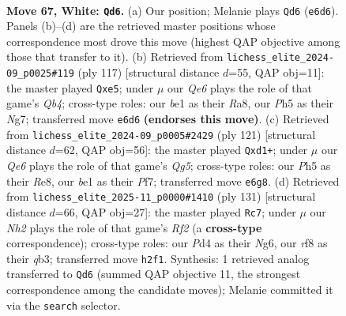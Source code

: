 \documentclass[11pt]{article}
\begin{document}
\begin{figure}[p]\centering
\begin{subfigure}{0.46\textwidth}\centering
\resizebox{\linewidth}{!}{%
\newchessgame
\chessboard[
  setfen={5rr1/p5p1/4Q2p/1k1p3P/p2P2P1/4P2K/q6N/4b3 w - - 42 67},
  showmover=false,
  pgfstyle=straightmove, color=movearrow, markmove={e6-d6}
]}
\caption{}
\end{subfigure}\hfill
\begin{subfigure}{0.46\textwidth}\centering
\resizebox{\linewidth}{!}{%
\newchessgame
\chessboard[
  setfen={r5k1/5pn1/2P1p1p1/1q2P1P1/4P3/p3Q3/2R3K1/2R5 b - - 0 59},
  showmover=false,
  pgfstyle=straightmove, color=movearrow, markmove={b5-e5}
]}
\caption{}
\end{subfigure}
\\[4pt]
\begin{subfigure}{0.46\textwidth}\centering
\resizebox{\linewidth}{!}{%
\newchessgame
\chessboard[
  setfen={4rk2/5p2/p6p/3R2p1/P1p3q1/2P3P1/1P3P2/3Q2K1 b - - 1 61},
  showmover=false,
  pgfstyle=straightmove, color=movearrow, markmove={g4-d1}
]}
\caption{}
\end{subfigure}\hfill
\begin{subfigure}{0.46\textwidth}\centering
\resizebox{\linewidth}{!}{%
\newchessgame
\chessboard[
  setfen={8/5r1k/1p4n1/1Pq5/5p2/1QB1pP1P/4R1PK/8 b - - 2 66},
  showmover=false,
  pgfstyle=straightmove, color=movearrow, markmove={f7-c7}
]}
\caption{}
\end{subfigure}
\caption{\textbf{Move 67, White: \texttt{Qd6}.} (a) Our position; Melanie plays \texttt{Qd6} (\texttt{e6d6}). Panels (b)--(d) are the retrieved master positions whose correspondence most drove this move (highest QAP objective among those that transfer to it). (b) Retrieved from \texttt{lichess\_elite\_2024-09\_p0025\#119} (ply 117) [structural distance $d$=55, QAP obj=11]: the master played \texttt{Qxe5}; under $\mu$ our \emph{Qe6} plays the role of that game's \emph{Qb4}; cross-type roles: our \emph{b}e1 as their \emph{R}a8, our \emph{P}h5 as their \emph{N}g7; transferred move \texttt{e6d6} \textbf{(endorses this move)}. (c) Retrieved from \texttt{lichess\_elite\_2024-09\_p0005\#2429} (ply 121) [structural distance $d$=62, QAP obj=56]: the master played \texttt{Qxd1+}; under $\mu$ our \emph{Qe6} plays the role of that game's \emph{Qg5}; cross-type roles: our \emph{P}h5 as their \emph{R}e8, our \emph{b}e1 as their \emph{P}f7; transferred move \texttt{e6g8}. (d) Retrieved from \texttt{lichess\_elite\_2025-11\_p0000\#1410} (ply 131) [structural distance $d$=66, QAP obj=27]: the master played \texttt{Rc7}; under $\mu$ our \emph{Nh2} plays the role of that game's \emph{Rf2} (a \textbf{cross-type} correspondence); cross-type roles: our \emph{P}d4 as their \emph{N}g6, our \emph{r}f8 as their \emph{q}b3; transferred move \texttt{h2f1}. Synthesis: 1 retrieved analog transferred to \texttt{Qd6} (summed QAP objective 11, the strongest correspondence among the candidate moves); Melanie committed it via the \texttt{search} selector.}
\label{fig:thought-m132}
\end{figure}
\end{document}
